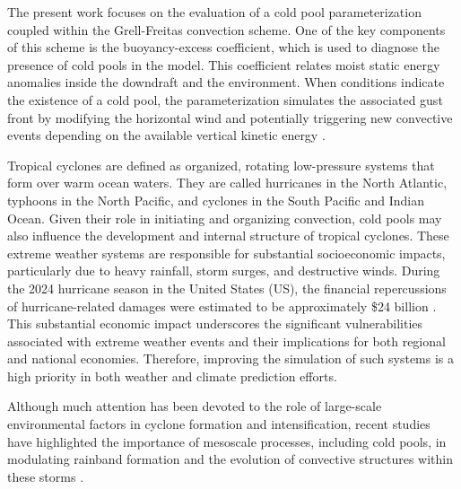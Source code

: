 The present work focuses on the evaluation of a cold pool parameterization coupled within the Grell-Freitas convection scheme. One of the key components of this scheme is the buoyancy-excess coefficient, which is used to diagnose the presence of cold pools in the model. This coefficient relates moist static energy anomalies inside the downdraft and the environment. When conditions indicate the existence of a cold pool, the parameterization simulates the associated gust front by modifying the horizontal wind and potentially triggering new convective events depending on the available vertical kinetic energy \cite{freitas2024parameterization}.

Tropical cyclones are defined as organized, rotating low-pressure systems that form over warm ocean waters. They are called hurricanes in the North Atlantic, typhoons in the North Pacific, and cyclones in the South Pacific and Indian Ocean. Given their role in initiating and organizing convection, cold pools may also influence the development and internal structure of tropical cyclones. These extreme weather systems are responsible for substantial socioeconomic impacts, particularly due to heavy rainfall, storm surges, and destructive winds. During the 2024 hurricane season in the United States (US), the financial repercussions of hurricane-related damages were estimated to be approximately \$24 billion \cite{noaa_hurricane_costs_2024, noaa_2025_active_year}. This substantial economic impact underscores the significant vulnerabilities associated with extreme weather events and their implications for both regional and national economies. Therefore, improving the simulation of such systems is a high priority in both weather and climate prediction efforts.

Although much attention has been devoted to the role of large-scale environmental factors in cyclone formation and intensification, recent studies have highlighted the importance of mesoscale processes, including cold pools, in modulating rainband formation and the evolution of convective structures within these storms \cite{sawada2010impactsPT1, chen2014fengshen, grant2018cold, cai2019effect}.

